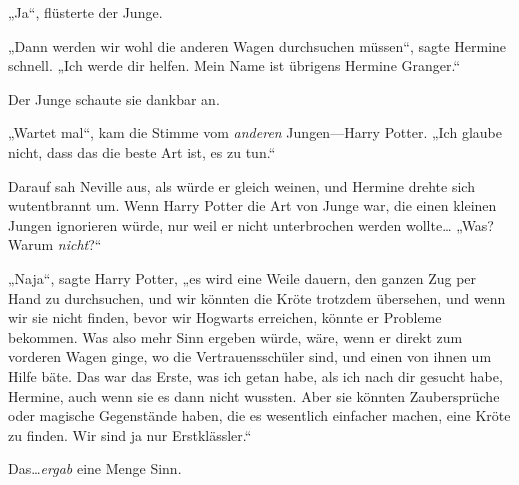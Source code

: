„Ja“, flüsterte der Junge.

„Dann werden wir wohl die anderen Wagen durchsuchen müssen“, sagte Hermine schnell. „Ich werde dir helfen. Mein Name ist übrigens Hermine Granger.“

Der Junge schaute sie dankbar an.

„Wartet mal“, kam die Stimme vom \emph{anderen} Jungen—Harry Potter. „Ich glaube nicht, dass das die beste Art ist, es zu tun.“

Darauf sah Neville aus, als würde er gleich weinen, und Hermine drehte sich wutentbrannt um. Wenn Harry Potter die Art von Junge war, die einen kleinen Jungen ignorieren würde, nur weil er nicht unterbrochen werden wollte… „Was? Warum \emph{nicht}?“

„Naja“, sagte Harry Potter, „es wird eine Weile dauern, den ganzen Zug per Hand zu durchsuchen, und wir könnten die Kröte trotzdem übersehen, und wenn wir sie nicht finden, bevor wir Hogwarts erreichen, könnte er Probleme bekommen. Was also mehr Sinn ergeben würde, wäre, wenn er direkt zum vorderen Wagen ginge, wo die Vertrauensschüler sind, und einen von ihnen um Hilfe bäte. Das war das Erste, was ich getan habe, als ich nach dir gesucht habe, Hermine, auch wenn sie es dann nicht wussten. Aber sie könnten Zaubersprüche oder magische Gegenstände haben, die es wesentlich einfacher machen, eine Kröte zu finden. Wir sind ja nur Erstklässler.“

Das…\emph{ergab} eine Menge Sinn.

